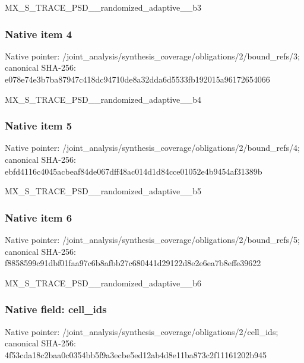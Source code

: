 \documentclass[10pt,a4paper]{article}
\begin{document}
\begingroup\raggedright\sloppy MX\_\allowbreak{}S\_\allowbreak{}TRACE\_\allowbreak{}PSD\_\allowbreak{}\_\allowbreak{}randomized\_\allowbreak{}adaptive\_\allowbreak{}\_\allowbreak{}b3\par\endgroup

\subsubsection{Native item 4}
Native pointer: /joint\_\allowbreak{}analysis/synthesis\_\allowbreak{}coverage/obligations/2/bound\_\allowbreak{}refs/3; canonical SHA-256: e078e74e3b7ba87947c418dc94710de8a32dda6d5533fb192015a96172654066

\begingroup\raggedright\sloppy MX\_\allowbreak{}S\_\allowbreak{}TRACE\_\allowbreak{}PSD\_\allowbreak{}\_\allowbreak{}randomized\_\allowbreak{}adaptive\_\allowbreak{}\_\allowbreak{}b4\par\endgroup

\subsubsection{Native item 5}
Native pointer: /joint\_\allowbreak{}analysis/synthesis\_\allowbreak{}coverage/obligations/2/bound\_\allowbreak{}refs/4; canonical SHA-256: ebfd4116c4045acbeaf84de067dff48ac014d1d84cce01052e4b9454af31389b

\begingroup\raggedright\sloppy MX\_\allowbreak{}S\_\allowbreak{}TRACE\_\allowbreak{}PSD\_\allowbreak{}\_\allowbreak{}randomized\_\allowbreak{}adaptive\_\allowbreak{}\_\allowbreak{}b5\par\endgroup

\subsubsection{Native item 6}
Native pointer: /joint\_\allowbreak{}analysis/synthesis\_\allowbreak{}coverage/obligations/2/bound\_\allowbreak{}refs/5; canonical SHA-256: f8858599c91dbf01faa97c6b8afbb27c680441d29122d8e2e6ea7b8effe39622

\begingroup\raggedright\sloppy MX\_\allowbreak{}S\_\allowbreak{}TRACE\_\allowbreak{}PSD\_\allowbreak{}\_\allowbreak{}randomized\_\allowbreak{}adaptive\_\allowbreak{}\_\allowbreak{}b6\par\endgroup

\subsubsection{Native field: cell\_\allowbreak{}ids}
Native pointer: /joint\_\allowbreak{}analysis/synthesis\_\allowbreak{}coverage/obligations/2/cell\_\allowbreak{}ids; canonical SHA-256: 4f53cda18c2baa0c0354bb5f9a3ecbe5ed12ab4d8e11ba873c2f11161202b945
\end{document}
